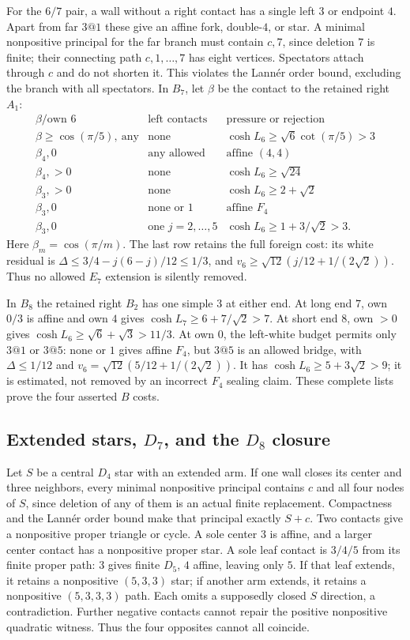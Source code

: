 \documentclass[11pt]{article}
\theoremstyle{remark}
\begin{document}
For the $6/7$ pair, a wall without a right contact has a single
left $3$ or endpoint $4$. Apart from far $3@1$ these give an
affine fork, double-$4$, or star. A minimal nonpositive principal
for the far branch must contain $c,7$, since deletion $7$ is
finite; their connecting path $c,1,\ldots,7$ has eight vertices.
Spectators attach through $c$ and do not shorten it. This violates
the Lann\'er order bound, excluding the branch with all spectators.
In $B_7$, let $\beta$ be the contact to the retained right $A_1$:
\[
\begin{array}{c|l|l}
\beta/\text{own }6&\text{left contacts}&\text{pressure or rejection}\\ \hline
\beta\ge\cos(\pi/5),\ \text{any}&\text{none}&\cosh L_6\ge\sqrt6\cot(\pi/5)>3\\
\beta_4,0&\text{any allowed}&\text{affine }(4,4)\\
\beta_4,>0&\text{none}&\cosh L_6\ge\sqrt{24}\\
\beta_3,>0&\text{none}&\cosh L_6\ge2+\sqrt2\\
\beta_3,0&\text{none or }1&\text{affine }F_4\\
\beta_3,0&\text{one }j=2,\ldots,5&\cosh L_6\ge1+3/\sqrt2>3.
\end{array}
\]
Here $\beta_m=\cos(\pi/m)$. The last row retains the full foreign
cost: its white residual is
$\Delta\le3/4-j(6-j)/12\le1/3$, and
$v_6\ge\sqrt{12}(j/12+1/(2\sqrt2))$.
Thus no allowed $E_7$ extension is silently removed.

In $B_8$ the retained right $B_2$ has one simple $3$ at either
end. At long end $7$, own $0/3$ is affine and own $4$ gives
$\cosh L_7\ge6+7/\sqrt2>7$.
At short end $8$, own $>0$ gives
$\cosh L_6\ge\sqrt6+\sqrt3>11/3$.
At own $0$, the left-white budget permits only $3@1$ or $3@5$:
none or $1$ gives affine $F_4$, but $3@5$ is an allowed bridge,
with $\Delta\le1/12$ and
$v_6=\sqrt{12}(5/12+1/(2\sqrt2))$.
It has $\cosh L_6\ge5+3\sqrt2>9$; it is estimated, not removed
by an incorrect $F_4$ sealing claim. These complete lists prove
the four asserted $B$ costs.

\subsection{Extended stars, \texorpdfstring{$D_7$}{D7}, and the \texorpdfstring{$D_8$}{D8} closure}

Let $S$ be a central $D_4$ star with an extended arm. If one wall
closes its center and three neighbors, every minimal nonpositive
principal contains $c$ and all four nodes of $S$, since deletion
of any of them is an actual finite replacement. Compactness and
the Lann\'er order bound make that principal exactly $S+c$.
Two contacts give a nonpositive proper triangle or cycle.
A sole center $3$ is affine, and a larger center contact has a
nonpositive proper star. A sole leaf contact is $3/4/5$ from its
finite proper path: $3$ gives finite $D_5$, $4$ affine, leaving
only $5$. If that leaf extends, it retains a nonpositive $(5,3,3)$
star; if another arm extends, it retains a nonpositive $(5,3,3,3)$
path. Each omits a supposedly closed $S$ direction, a contradiction.
Further negative contacts cannot repair the positive nonpositive
quadratic witness. Thus the four opposites cannot all coincide.
\end{document}
